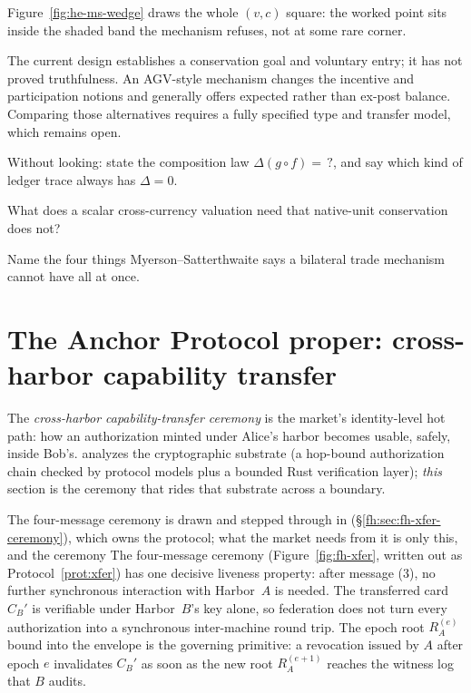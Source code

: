 \documentclass[11pt,a4paper]{article}
\theoremstyle{definition}
\theoremstyle{definition}
\theoremstyle{remark}
\begin{document}
Figure~\ref{fig:he-ms-wedge} draws the whole $(v,c)$ square: the worked point
sits inside the shaded band the mechanism refuses, not at some rare corner.



The current design establishes a conservation goal and voluntary entry; it has not
proved truthfulness. An AGV-style mechanism changes the incentive and participation
notions and generally offers expected rather than ex-post balance. Comparing those
alternatives requires a fully specified type and transfer model, which remains open.

\pdexercisepointer*{\ref{ex:he-ms-assumptions}}{\ref{ex:he-phi-exposure-bound}}{\pageref{ex:he-ms-assumptions}}

\begin{pdrecitation}
\item Without looking: state the composition law $\Delta(g\circ f)=\,?$, and say which kind of ledger trace always has $\Delta=0$.
\item What does a scalar cross-currency valuation need that native-unit conservation does not?
\item Name the four things Myerson--Satterthwaite says a bilateral trade mechanism cannot have all at once.
\end{pdrecitation}

\section{The Anchor Protocol proper: cross-harbor capability transfer}\label{sec:anchor}\label{sec:fh-xfer}

The \emph{cross-harbor capability-transfer ceremony} is the market's identity-level
hot path: how an authorization minted under Alice's harbor becomes usable, safely,
inside Bob's.  analyzes the cryptographic
substrate (a hop-bound
authorization chain checked by protocol models plus a bounded Rust verification
layer); \emph{this} section is the ceremony that rides that substrate across a
boundary.

\ifpdbook
The four-message ceremony is drawn and stepped through in
 (\S\ref{fh:sec:fh-xfer-ceremony}), which owns
the protocol; what the market needs from it is only this, and the ceremony
\else
%
The four-message ceremony (Figure~\ref{fig:fh-xfer}, written out as
Protocol~\ref{prot:xfer})
\fi has one decisive liveness property: after message (3),
no further synchronous interaction with Harbor~$A$ is needed. The transferred card
$C_B'$ is verifiable under Harbor~$B$'s key alone, so federation does not turn every
authorization into a synchronous inter-machine round trip. The epoch root $R_A^{(e)}$
bound into the envelope is the governing primitive: a revocation issued by $A$
after epoch $e$ invalidates $C_B'$ as soon as the new root $R_A^{(e+1)}$ reaches the
witness log that $B$ audits.
\end{document}
